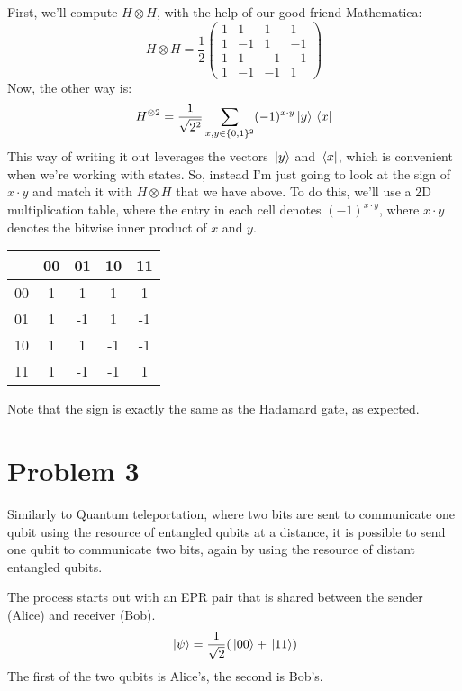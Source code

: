 \documentclass[10pt]{article}
\begin{document}
\begin{enumerate}[label=\alph*)]
			\begin{solution}
				First, we'll compute \( H \otimes H \), with the help of our good friend Mathematica: 
				\[
					H \otimes H = \frac{1}{2}\begin{pmatrix} 1&1&1&1\\1&-1&1&-1\\1&1&-1&-1\\1&-1&-1&1 \end{pmatrix} 
				\] 
				Now, the other way is: 
				\[
					H^{\otimes 2} = \frac{1}{\sqrt{2^2} }\sum_{x, y \in \{0, 1\}^2} (-1)^{x \cdot y}\ket*{y} \bra*{x}
				\] 
				This way of writing it out leverages the vectors \( \ket*{y}  \) and \( \bra*{x} \), which 
				is convenient when we're working with states. So, instead I'm just going to look at the sign of 
				\( x \cdot y \) and match it with  \( H \otimes H \) that we have above. To do this, we'll use a 2D 
				multiplication table, where the entry in each cell denotes \( (-1)^{x \cdot y} \), where 
				\( x \cdot y \) denotes the bitwise inner product of \( x \) and \( y \). 
				\begin{center}
					\begin{tabular}{c|c|c|c|c}
						   & 00 & 01 & 10 & 11 \\
						   \hline
						00 & 1  & 1  & 1  & 1  \\
						\hline
						01 & 1  & -1 & 1  & -1 \\
						\hline
						10 & 1  & 1  & -1 & -1  \\
						\hline
						11 & 1  & -1 & -1 & 1
					\end{tabular}
				\end{center}
				Note that the sign is exactly the same as the Hadamard gate, as expected.   
			\end{solution}
	\end{enumerate}

	\pagebreak
	\section*{Problem 3}
	Similarly to Quantum teleportation, where two bits are sent to communicate one qubit using the resource of 
	entangled qubits at a distance, it is possible to send one qubit to communicate two bits, again by using the 
	resource of distant entangled qubits. 

	The process starts out with an EPR pair that is shared between the sender (Alice) and receiver (Bob).
	\[
	\ket*{\psi} = \frac{1}{\sqrt{2} }(\ket*{00} + \ket*{11})
	\] 
	The first of the two qubits is Alice's, the second is Bob's.
\end{document}

